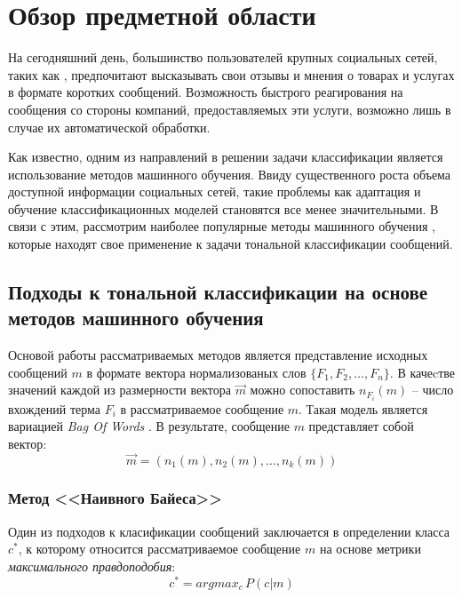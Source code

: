 \newpage
\section{Обзор предметной области}
    На сегодняшний день, большинство пользователей крупных социальных сетей,
    таких как \twitter, предпочитают высказывать свои отзывы и мнения о товарах
    и услугах в формате коротких сообщений. Возможность быстрого реагирования
    на сообщения со стороны компаний, предоставляемых эти услуги, возможно лишь
    в случае их автоматической обработки.

    Как известно, одним из направлений в решении задачи классификации является
    использование методов машинного обучения. Ввиду существенного роста объема
    доступной информации социальных сетей, такие проблемы как адаптация и
    обучение классификационных моделей становятся все менее значительными.
    В связи с этим, рассмотрим наиболее популярные методы машинного обучения \cite{svmAdvantages},
    которые находят свое применение к задачи тональной классификации сообщений.

    \subsection{Подходы к тональной классификации на основе методов машинного обучения}
        \label{sec:mlApproaches}
        Основой работы рассматриваемых методов является представление исходных
        сообщений $m$ в формате вектора нормализованых слов $\{F_1, F_2, \ldots, F_n\}$.
        В качеcтве значений каждой из размерности вектора $\vec{m}$ можно сопоставить
        $n_{F_i}(m)$ -- число вхождений терма $F_i$ в рассматриваемое сообщение $m$.
        Такая модель является вариацией {\it Bag Of Words} \cite{svmAdvantages}.
        В результате, сообщение $m$ представляет собой вектор:
        \begin{equation}
            \vec{m} = (n_1(m), n_2(m), \ldots, n_k(m))
        \end{equation}

        \subsubsection{Метод <<Наивного Байеса>>}
        Один из подходов к класификации сообщений заключается в определении класса $c^{*}$,
        к которому относится рассматриваемое сообщение $m$ на основе метрики
        {\it максимального правдоподобия}:
        \begin{equation}
            c^{*} = argmax_c \hspace{2pt} P(c|m)
        \end{equation}

